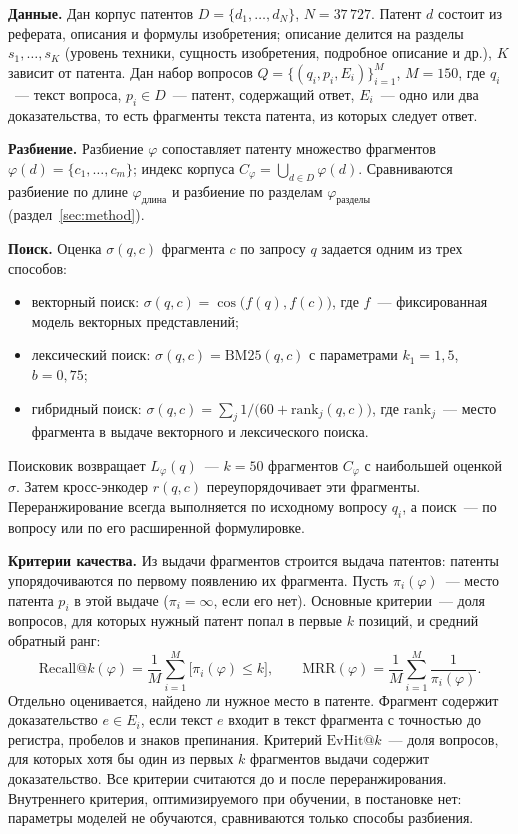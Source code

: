 \documentclass{article}
\makeatletter
\newcommand{\Rk}[1]{\mathrm{Recall@}#1}
\newcommand{\Ek}[1]{\mathrm{EvHit@}#1}
\makeatother
\begin{document}
\textbf{Данные.} Дан корпус патентов $D = \{d_1, \ldots, d_N\}$, $N = 37\,727$. Патент $d$ состоит из реферата, описания и формулы изобретения; описание делится на разделы $s_1, \ldots, s_K$ (уровень техники, сущность изобретения, подробное описание и др.), $K$ зависит от патента. Дан набор вопросов $Q = \{(q_i, p_i, E_i)\}_{i=1}^{M}$, $M = 150$, где $q_i$~--- текст вопроса, $p_i \in D$~--- патент, содержащий ответ, $E_i$~--- одно или два доказательства, то есть фрагменты текста патента, из которых следует ответ.

\textbf{Разбиение.} Разбиение $\varphi$ сопоставляет патенту множество фрагментов $\varphi(d) = \{c_1, \ldots, c_m\}$; индекс корпуса $C_\varphi = \bigcup_{d \in D} \varphi(d)$. Сравниваются разбиение по длине $\varphi_{\text{длина}}$ и разбиение по разделам $\varphi_{\text{разделы}}$ (раздел~\ref{sec:method}).

\textbf{Поиск.} Оценка $\sigma(q, c)$ фрагмента $c$ по запросу $q$ задается одним из трех способов:
\begin{itemize}
    \item векторный поиск: $\sigma(q, c) = \cos\bigl(f(q), f(c)\bigr)$, где $f$~--- фиксированная модель векторных представлений;
    \item лексический поиск: $\sigma(q, c) = \mathrm{BM25}(q, c)$ с параметрами $k_1 = 1{,}5$, $b = 0{,}75$;
    \item гибридный поиск: $\sigma(q, c) = \sum_{j} 1 / \bigl(60 + \mathrm{rank}_j(q, c)\bigr)$, где $\mathrm{rank}_j$~--- место фрагмента в выдаче векторного и лексического поиска.
\end{itemize}
Поисковик возвращает $L_\varphi(q)$~--- $k = 50$ фрагментов $C_\varphi$ с наибольшей оценкой $\sigma$. Затем кросс-энкодер $r(q, c)$ переупорядочивает эти фрагменты. Переранжирование всегда выполняется по исходному вопросу $q_i$, а поиск~--- по вопросу или по его расширенной формулировке.

\textbf{Критерии качества.} Из выдачи фрагментов строится выдача патентов: патенты упорядочиваются по первому появлению их фрагмента. Пусть $\pi_i(\varphi)$~--- место патента $p_i$ в этой выдаче ($\pi_i = \infty$, если его нет). Основные критерии~--- доля вопросов, для которых нужный патент попал в первые $k$ позиций, и средний обратный ранг:
\[
    \Rk{k}(\varphi) = \frac{1}{M} \sum_{i=1}^{M} \bigl[\pi_i(\varphi) \le k\bigr], \qquad
    \mathrm{MRR}(\varphi) = \frac{1}{M} \sum_{i=1}^{M} \frac{1}{\pi_i(\varphi)}.
\]
Отдельно оценивается, найдено ли нужное место в патенте. Фрагмент содержит доказательство $e \in E_i$, если текст $e$ входит в текст фрагмента с точностью до регистра, пробелов и знаков препинания. Критерий $\Ek{k}$~--- доля вопросов, для которых хотя бы один из первых $k$ фрагментов выдачи содержит доказательство. Все критерии считаются до и после переранжирования. Внутреннего критерия, оптимизируемого при обучении, в постановке нет: параметры моделей не обучаются, сравниваются только способы разбиения.
\end{document}
